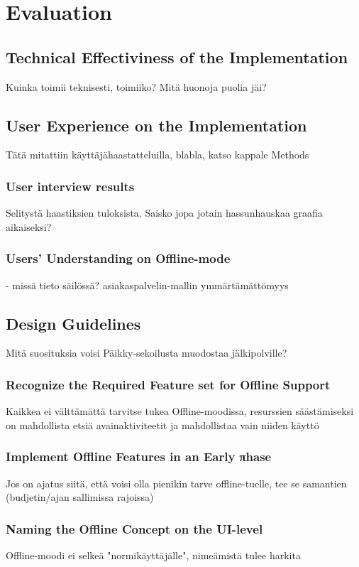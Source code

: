 \chapter{Evaluation}

\section{Technical Effectiviness of the Implementation}
Kuinka toimii teknisesti, toimiiko? Mitä huonoja puolia jäi?



\section{User Experience on the Implementation}
Tätä mitattiin käyttäjähaastatteluilla, blabla, katso kappale Methods

\subsection{User interview results}
Selitystä haastiksien tuloksista. Saisko jopa jotain hassunhauskaa graafia aikaiseksi?


\subsection{Users' Understanding on Offline-mode}
- missä tieto säilössä? asiakaspalvelin-mallin ymmärtämättömyys




\section{Design Guidelines}
Mitä suosituksia voisi Päikky-sekoilusta muodostaa jälkipolville?

\subsection{Recognize the Required Feature set for Offline Support}
Kaikkea ei välttämättä tarvitse tukea Offline-moodissa, resurssien säästämiseksi on mahdollista etsiä avainaktiviteetit ja mahdollistaa vain niiden käyttö


\subsection{Implement Offline Features in an Early πhase}
Jos on ajatus siitä, että voisi olla pienikin tarve offline-tuelle, tee se samantien (budjetin/ajan sallimissa rajoissa)

\subsection{Naming the Offline Concept on the UI-level}
Offline-moodi ei selkeä "normikäyttäjälle", nimeämistä tulee harkita
